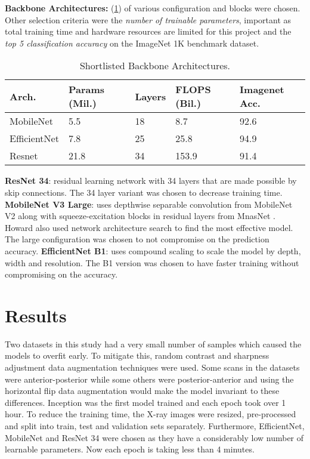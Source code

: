 \documentclass[10pt,twocolumn,letterpaper]{article}
\begin{document}
\textbf{Backbone Architectures:} (\cref{tab:selArch}) of various configuration and blocks were chosen. Other selection criteria were the \textit{number of trainable parameters}, important as total training time and hardware resources are limited for this project and the \textit{top 5 classification accuracy} on the ImageNet 1K benchmark dataset.
\begin{table}
  \centering
  \begin{tabular}{p{1.7cm}|p{1cm}|p{1cm}|p{1cm}|p{1cm}}
  \toprule
  Arch. & Params (Mil.) & Layers & FLOPS (Bil.) & Imagenet Acc.\\
  \midrule
  MobileNet & 5.5 & 18 & 8.7 & 92.6\\
  \midrule
  EfficientNet & 7.8 & 25 & 25.8 & 94.9\\
  \midrule
  Resnet & 21.8 & 34 & 153.9 & 91.4\\
  \bottomrule
  \end{tabular}
  \caption{Shortlisted Backbone Architectures.}
  \vspace{-1.5em}
  \label{tab:selArch}
\end{table}
\textbf{ResNet 34}: residual learning network with 34 layers that are made possible by skip connections. The 34 layer variant was chosen to decrease training time. \cite{he2016deep}
\textbf{MobileNet V3 Large}: uses depthwise separable convolution from MobileNet V2 \cite{sandler2018mobilenetv2} along with squeeze-excitation blocks in residual layers from MnasNet \cite{tan2019mnasnet}. Howard \etal \cite{howard2019searching} also used network architecture search to find the most effective model. The large configuration was chosen to not compromise on the prediction accuracy.
\textbf{EfficientNet B1}: uses compound scaling to scale the model by depth, width and resolution. The B1 version was chosen to have faster training without compromising on the accuracy. \cite{tan2019efficientnet}
\section{Results} 
\label{sec:method}
Two datasets in this study had a very small number of samples which caused the models to overfit early. To mitigate this, random contrast and sharpness adjustment \cite{nanni2021comparison} data augmentation techniques were used. Some scans in the datasets were anterior-posterior while some others were posterior-anterior and using the horizontal flip data augmentation would make the model invariant to these differences\cite{botev2022regularising}.
Inception was the first model trained and each epoch took over 1 hour. To reduce the training time, the X-ray images were resized, pre-processed and split into train, test and validation sets separately. Furthermore, EfficientNet, MobileNet and ResNet 34 were chosen as they have a considerably low number of learnable parameters. Now each epoch is taking less than 4 minutes. 
\end{document}
